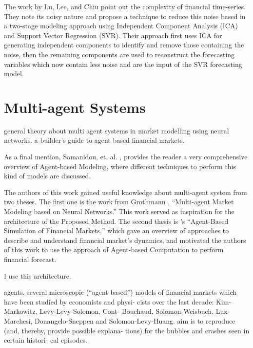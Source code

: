 The work by Lu, Lee, and Chiu \cite{Lu2009} point out the complexity of
financial time-series. They note its noisy nature and propose a technique to
reduce this noise based in a two-stage modeling approach using Independent
Component Analysis (ICA) and Support Vector Regression (SVR). Their approach
first uses ICA for generating independent components to identify and remove
those containing the noise, then the remaining components are used to
reconstruct the forecasting variables which now contain less noise and are the
input of the SVR forecasting model.

\section{Multi-agent Systems}
\label{section:multi-agent-systems}
\cite{Grothmann2002} general theory about multi agent systems in market
modelling using neural networks.
\cite{Lebaron2001} a builder's guide to agent based financial markets.

As a final mention, Samanidou, et. al. \cite{Samanidou_2007}, provides the
reader a very comprehensive overview of Agent-based Modeling, where different
techniques to perform this kind of models are discussed.

The authors of this work gained useful knowledge about multi-agent system from
two theses. The first one is the work from Grothmann \cite{Grothmann2002},
``Multi-agent Market Modeling based on Neural Networks.'' This work served as
inspiration for the architecture of the Proposed Method. The second thesis is
\cite{Boer-Sorban2008}'s ``Agent-Based Simulation of Financial Markets,'' which gave
an overview of approaches to describe and understand financial market's
dynamics, and motivated the authors of this work to use the approach of
Agent-based Computation to perform financial forecast.

\cite{Shoham2009} I use this architecture.

\cite{Bundesbank2007} agents. several microscopic (“agent-based”) models
of financial markets which have been studied by economists and physi- cists over
the last decade: Kim-Markowitz, Levy-Levy-Solomon, Cont- Bouchaud,
Solomon-Weisbuch, Lux-Marchesi, Donangelo-Sneppen and Solomon-Levy-Huang. aim is
to reproduce (and, thereby, provide possible explana- tions) for the bubbles and
crashes seen in certain histori- cal episodes.

